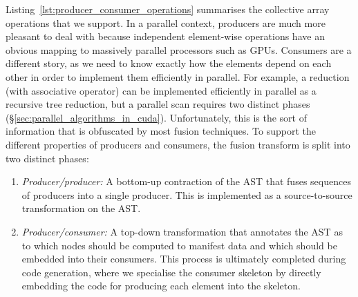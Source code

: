 Listing~\ref{lst:producer_consumer_operations} summarises the collective array operations that we
support. In a parallel context, producers are much more pleasant to deal with
because independent element-wise operations have an obvious mapping to massively
parallel processors such as GPUs. Consumers are
a different story, as we need to know exactly how the elements depend on each
other in order to implement them efficiently in parallel. For example, a
reduction (with associative operator) can be implemented efficiently in parallel
as a recursive tree reduction, but a parallel scan requires two distinct phases
(\S\ref{sec:parallel_algorithms_in_cuda}). Unfortunately, this is the sort of
information that is obfuscated by most fusion techniques. To support the
different properties of producers and consumers, the fusion transform is split
into two distinct phases:
%
\begin{enumerate}
    \item \emph{Producer/producer:} A bottom-up contraction of the AST that
        fuses sequences of producers into a single producer. This is implemented
        as a source-to-source transformation on the AST\@.

    \item \emph{Producer/consumer:} A top-down transformation that annotates the
        AST as to which nodes should be computed to manifest data and which
        should be embedded into their consumers. This process is ultimately
        completed during code generation, where we specialise the consumer
        skeleton by directly embedding the code for producing each element into
        the skeleton.

\end{enumerate}

